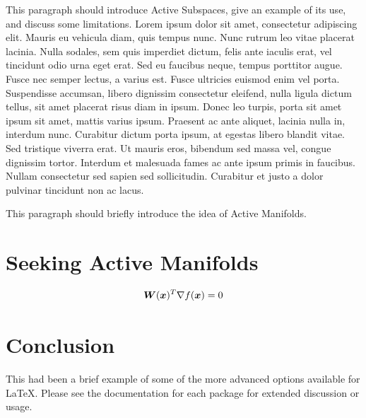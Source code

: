 \documentclass[]{aiaa-tc}%
\begin{document}
This paragraph should introduce Active Subspaces, give an example of its use, and discuss some limitations. \cite{constantine2015} Lorem ipsum dolor sit amet, consectetur adipiscing elit. Mauris eu vehicula diam, quis tempus nunc. Nunc rutrum leo vitae placerat lacinia. Nulla sodales, sem quis imperdiet dictum, felis ante iaculis erat, vel tincidunt odio urna eget erat. Sed eu faucibus neque, tempus porttitor augue. Fusce nec semper lectus, a varius est. Fusce ultricies euismod enim vel porta. Suspendisse accumsan, libero dignissim consectetur eleifend, nulla ligula dictum tellus, sit amet placerat risus diam in ipsum. Donec leo turpis, porta sit amet ipsum sit amet, mattis varius ipsum. Praesent ac ante aliquet, lacinia nulla in, interdum nunc. Curabitur dictum porta ipsum, at egestas libero blandit vitae. Sed tristique viverra erat. Ut mauris eros, bibendum sed massa vel, congue dignissim tortor. Interdum et malesuada fames ac ante ipsum primis in faucibus. Nullam consectetur sed sapien sed sollicitudin. Curabitur et justo a dolor pulvinar tincidunt non ac lacus.

This paragraph should briefly introduce the idea of Active Manifolds.

\section{Seeking Active Manifolds}

\begin{equation}
  \label{eq:inactive_manifold}
  \boldsymbol{W}(\boldsymbol{x})^T \nabla f(\boldsymbol{x}) = 0
\end{equation}%
%
%
%
%

\section{Conclusion}

This had been a brief example of some of the more advanced options
available for \LaTeX.
Please see the documentation for each package for extended discussion or
usage.



\end{document}
